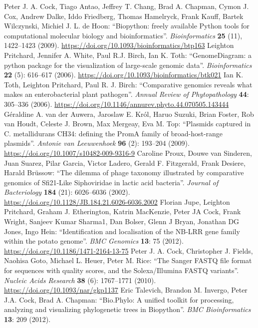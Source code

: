 \documentclass{report}
\begin{document}
\begin{thebibliography}{99}
Peter J. A. Cock, Tiago Antao, Jeffrey T. Chang, Brad A. Chapman, Cymon J. Cox, Andrew Dalke, Iddo Friedberg, Thomas Hamelryck, Frank Kauff, Bartek Wilczynski, Michiel J. L. de Hoon: ``Biopython: freely available Python tools for computational molecular biology and bioinformatics''. {\it Bioinformatics} {\bf 25} (11), 1422--1423 (2009).
\url{https://doi.org/10.1093/bioinformatics/btp163}
Leighton Pritchard, Jennifer A. White, Paul R.J. Birch, Ian K. Toth: ``GenomeDiagram: a python package for the visualization of large-scale genomic data''.  {\it Bioinformatics} {\bf 22} (5): 616--617 (2006).
\url{https://doi.org/10.1093/bioinformatics/btk021}
Ian K. Toth, Leighton Pritchard, Paul R. J. Birch: ``Comparative genomics reveals what makes an enterobacterial plant pathogen''. {\it Annual Review of Phytopathology} {\bf 44}: 305--336 (2006).
\url{https://doi.org/10.1146/annurev.phyto.44.070505.143444}
G\'eraldine A. van der Auwera, Jaroslaw E. Kr\'ol, Haruo Suzuki, Brian Foster, Rob van Houdt, Celeste J. Brown, Max Mergeay, Eva M. Top: ``Plasmids captured in C. metallidurans CH34: defining the PromA family of broad-host-range plasmids''.
\textit{Antonie van Leeuwenhoek} {\bf 96} (2): 193--204 (2009).
\url{https://doi.org/10.1007/s10482-009-9316-9}
Caroline Proux, Douwe van Sinderen, Juan Suarez, Pilar Garcia, Victor Ladero, Gerald F. Fitzgerald, Frank Desiere, Harald Br\"ussow:
``The dilemma of phage taxonomy illustrated by comparative genomics of Sfi21-Like Siphoviridae in lactic acid bacteria''.  \textit{Journal of Bacteriology} {\bf 184} (21): 6026--6036 (2002).
\url{https://doi.org/10.1128/JB.184.21.6026-6036.2002}
Florian Jupe, Leighton Pritchard, Graham J. Etherington, Katrin MacKenzie, Peter JA Cock, Frank Wright, Sanjeev Kumar Sharma1, Dan Bolser, Glenn J Bryan, Jonathan DG Jones, Ingo Hein: ``Identification and localisation of the NB-LRR gene family within the potato genome''. \textit{BMC Genomics} {\bf 13}: 75 (2012).
\url{https://doi.org/10.1186/1471-2164-13-75}
Peter J. A. Cock, Christopher J. Fields, Naohisa Goto, Michael L. Heuer, Peter M. Rice: ``The Sanger FASTQ file format for sequences with quality scores, and the Solexa/Illumina FASTQ variants''.  \textit{Nucleic Acids Research} {\bf 38} (6): 1767--1771 (2010). \url{https://doi.org/10.1093/nar/gkp1137}
Eric Talevich, Brandon M. Invergo, Peter J.A. Cock, Brad A. Chapman: ``Bio.Phylo: A unified toolkit for processing, analyzing and visualizing phylogenetic trees in Biopython''.  \textit{BMC Bioinformatics} {\bf 13}: 209 (2012).

\end{thebibliography}
\end{document}
